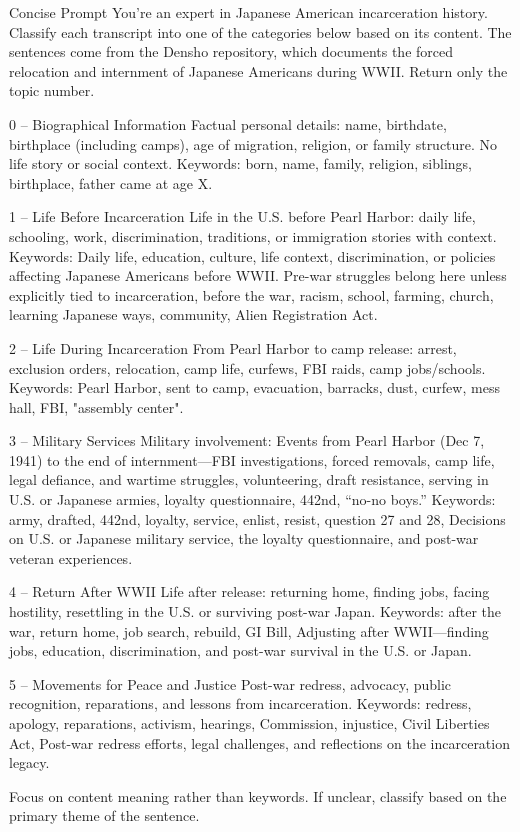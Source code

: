 Concise Prompt
You're an expert in Japanese American incarceration history. Classify each transcript into one of the categories below based on its content. The sentences come from the Densho repository, which documents the forced relocation and internment of Japanese Americans during WWII. Return only the topic number. 

0 – Biographical Information
Factual personal details: name, birthdate, birthplace (including camps), age of migration, religion, or family structure. No life story or social context.
Keywords: born, name, family, religion, siblings, birthplace, father came at age X.

1 – Life Before Incarceration
Life in the U.S. before Pearl Harbor: daily life, schooling, work, discrimination, traditions, or immigration stories with context.
Keywords: Daily life, education, culture, life context, discrimination, or policies affecting Japanese Americans before WWII. Pre-war struggles belong here unless explicitly tied to incarceration, before the war, racism, school, farming, church, learning Japanese ways, community, Alien Registration Act.

2 – Life During Incarceration 
From Pearl Harbor to camp release: arrest, exclusion orders, relocation, camp life, curfews, FBI raids, camp jobs/schools.
Keywords: Pearl Harbor, sent to camp, evacuation, barracks, dust, curfew, mess hall, FBI, "assembly center".

3 – Military Services
Military involvement: Events from Pearl Harbor (Dec 7, 1941) to the end of internment—FBI investigations, forced removals, camp life, legal defiance, and wartime struggles, volunteering, draft resistance, serving in U.S. or Japanese armies, loyalty questionnaire, 442nd, “no-no boys.”
Keywords: army, drafted, 442nd, loyalty, service, enlist, resist, question 27 and 28, Decisions on U.S. or Japanese military service, the loyalty questionnaire, and post-war veteran experiences.


4 – Return After WWII
Life after release: returning home, finding jobs, facing hostility, resettling in the U.S. or surviving post-war Japan.
Keywords: after the war, return home, job search, rebuild, GI Bill, Adjusting after WWII—finding jobs, education, discrimination, and post-war survival in the U.S. or Japan.

5 – Movements for Peace and Justice
Post-war redress, advocacy, public recognition, reparations, and lessons from incarceration.
Keywords: redress, apology, reparations, activism, hearings, Commission, injustice, Civil Liberties Act, Post-war redress efforts, legal challenges, and reflections on the incarceration legacy.

Focus on content meaning rather than keywords. If unclear, classify based on the primary theme of the sentence.
